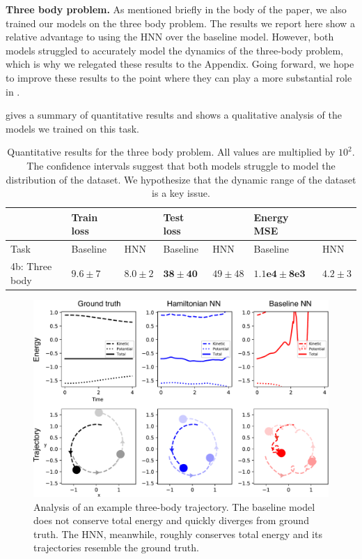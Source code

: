 \documentclass{article}
\begin{document}
\textbf{Three body problem.} As mentioned briefly in the body of the paper, we also trained our models on the three body problem. The results we report here show a relative advantage to using the HNN over the baseline model. However, both models struggled to accurately model the dynamics of the three-body problem, which is why we relegated these results to the Appendix. Going forward, we hope to improve these results to the point where they can play a more substantial role in .

 gives a summary of quantitative results and  shows a qualitative analysis of the models we trained on this task.

\begin{table}[H]
\centering
\caption{Quantitative results for the three body problem. All values are multiplied by $10^{2}$. The confidence intervals suggest that both models struggle to model the distribution of the dataset. We hypothesize that the dynamic range of the dataset is a key issue.}
\begin{tabular}{@{}lllllll@{}}
\toprule
& Train loss & & Test loss & & Energy MSE & \\ \midrule
Task & Baseline & HNN & Baseline & HNN & Baseline & HNN \\ \midrule
4b: Three body & $9.6\pm7$ & $8.0\pm2$ & $\mathbf{38\pm40}$ & $49\pm48$ & $\mathbf{1.1e4\pm8e3}$ & $4.2\pm3$  \\ \bottomrule
\end{tabular}
\end{table}

\begin{figure}[H]
\centering
\includegraphics[width=.8\textwidth]{static/3body-results}
\caption{
    Analysis of an example three-body trajectory. The baseline model does not conserve total energy and quickly diverges from ground truth. The HNN, meanwhile, roughly conserves total energy and its trajectories resemble the ground truth.
}
\end{figure}
\end{document}
